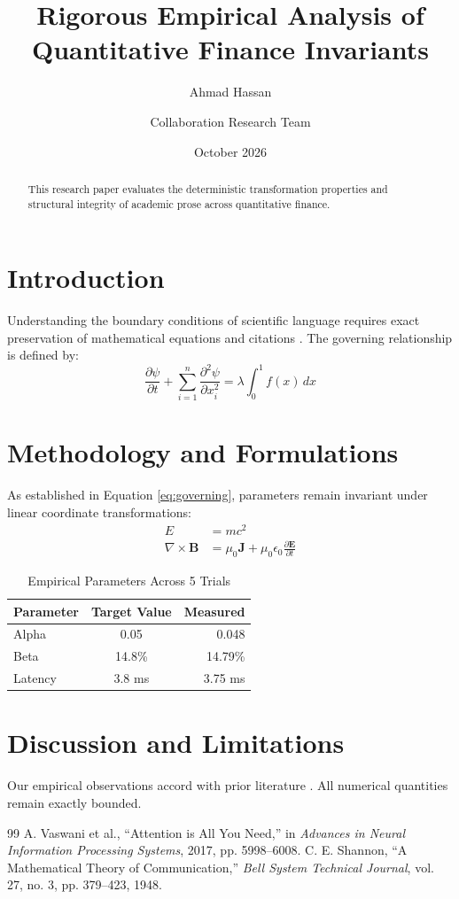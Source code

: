 \documentclass[11pt,a4paper]{article}
\title{Rigorous Empirical Analysis of Quantitative Finance Invariants}
\author{Ahmad Hassan \and Collaboration Research Team}
\date{October 2026}
\begin{document}
\maketitle

\begin{abstract}
This research paper evaluates the deterministic transformation properties and structural integrity of academic prose across quantitative finance.
\end{abstract}

\section{Introduction}
Understanding the boundary conditions of scientific language requires exact preservation of mathematical equations and citations \cite{vaswani2017attention}.
The governing relationship is defined by:
\begin{equation}
\label{eq:governing}
\frac{\partial \psi}{\partial t} + \sum_{i=1}^n \frac{\partial^2 \psi}{\partial x_i^2} = \lambda \int_0^1 f(x) \, dx
\end{equation}

\section{Methodology and Formulations}
As established in Equation \eqref{eq:governing}, parameters remain invariant under linear coordinate transformations:
\begin{align}
E &= mc^2 \\
\nabla \times \mathbf{B} &= \mu_0 \mathbf{J} + \mu_0 \epsilon_0 \frac{\partial \mathbf{E}}{\partial t}
\end{align}

\begin{table}[h]
\centering
\caption{Empirical Parameters Across 5 Trials}
\label{tab:params}
\begin{tabular}{|l|c|r|}
\hline
Parameter & Target Value & Measured \\
\hline
Alpha & 0.05 & 0.048 \\
Beta & 14.8\% & 14.79\% \\
Latency & 3.8 ms & 3.75 ms \\
\hline
\end{tabular}
\end{table}

\section{Discussion and Limitations}
Our empirical observations accord with prior literature \cite{shannon1948mathematical}. All numerical quantities remain exactly bounded.

\begin{thebibliography}{99}
A. Vaswani et al., ``Attention is All You Need,'' in \textit{Advances in Neural Information Processing Systems}, 2017, pp. 5998--6008.
C. E. Shannon, ``A Mathematical Theory of Communication,'' \textit{Bell System Technical Journal}, vol. 27, no. 3, pp. 379--423, 1948.
\end{thebibliography}
\end{document}
